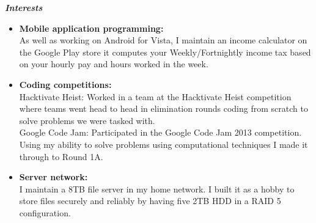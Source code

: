 \documentclass{res}
\begin{document}
\begin{resume}
\begin{itemize}
 \end{itemize}
 \vspace{0.2in} 
 {\sl \textbf{Interests}}
  
   \begin{itemize} \itemsep -2pt %
   \item \textbf{Mobile application programming:} \\ \hfill As well as working
   on Android for Vista, I maintain an income calculator on the Google Play store
   it computes your Weekly/Fortnightly income tax based on your hourly pay
   and hours worked in the week.
   \item \textbf{Coding competitions:} \\ \hfill Hacktivate Heist:
   Worked in a team at the Hacktivate Heist competition where teams
   went head to head in elimination rounds coding from scratch to
   solve problems we were tasked with.
   \\ Google Code Jam: Participated in the Google Code Jam 2013 
   competition. Using my ability to solve problems using computational 
   techniques I made it through to Round 1A.   
   \item \textbf{Server network:} \\ \hfill I maintain a 8TB file server 
   in my home network. I built it as a hobby to store files securely and 
   reliably by having five 2TB HDD in a RAID 5 configuration.   
 \end{itemize}
 
 
 
 

 
\end{resume} 
\end{document}
